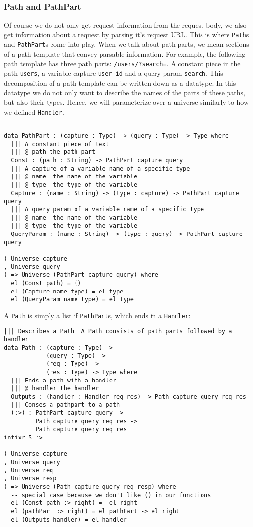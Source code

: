 \documentclass[12pt,a4paper]{article}
\begin{document}
\subsubsection{Path and PathPart}
Of course we do not only get request information from the request body,
we also get information about a request by parsing it's request URL. This
is where \texttt{Path}s and \texttt{PathPart}s come into play. 
When we talk about path parts, we mean sections of a path template that convey parsable information.
For example, the following path template has three path parts: \texttt{/users/?search=}. A constant piece
in the path \texttt{users}, a variable capture \texttt{user\_id} and a query param \texttt{search}. This
decomposition of a path template can be written down as a datatype. In this datatype we do not only
want to describe the names of the parts of these paths, but also their types. Hence, we will parameterize
over a universe similarly to how we defined \texttt{Handler}.
\begin{verbatim}

data PathPart : (capture : Type) -> (query : Type) -> Type where
  ||| A constant piece of text
  ||| @ path the path part
  Const : (path : String) -> PathPart capture query
  ||| A capture of a variable name of a specific type
  ||| @ name  the name of the variable
  ||| @ type  the type of the variable
  Capture : (name : String) -> (type : capture) -> PathPart capture query
  ||| A query param of a variable name of a specific type
  ||| @ name  the name of the variable
  ||| @ type  the type of the variable
  QueryParam : (name : String) -> (type : query) -> PathPart capture query

( Universe capture
, Universe query
) => Universe (PathPart capture query) where
  el (Const path) = ()
  el (Capture name type) = el type
  el (QueryParam name type) = el type
\end{verbatim}

A \texttt{Path} is simply a list if \texttt{PathPart}s, which ends in a \texttt{Handler}:
\begin{verbatim}
||| Describes a Path. A Path consists of path parts followed by a handler
data Path : (capture : Type) -> 
            (query : Type) ->
            (req : Type) ->
            (res : Type) -> Type where
  ||| Ends a path with a handler
  ||| @ handler the handler
  Outputs : (handler : Handler req res) -> Path capture query req res
  ||| Conses a pathpart to a path
  (:>) : PathPart capture query ->
         Path capture query req res ->
         Path capture query req res
infixr 5 :>

( Universe capture
, Universe query
, Universe req
, Universe resp
) => Universe (Path capture query req resp) where
  -- special case because we don't like () in our functions
  el (Const path :> right) =  el right
  el (pathPart :> right) = el pathPart -> el right
  el (Outputs handler) = el handler
\end{verbatim}
\end{document}
